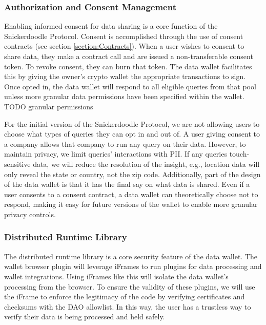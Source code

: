 \subsubsection{Authorization and Consent Management}

Enabling informed consent for data sharing is a core function of the Snickerdoodle Protocol. Consent is accomplished through the use of consent contracts 
(see section \ref{section:Contracts}). When a user wishes to consent to share data, they make a contract call and are issued a non-transferable consent 
token. To revoke consent, they can burn that token. The data wallet facilitates this by giving the owner's crypto wallet the appropriate transactions to 
sign. Once opted in, the data wallet will respond to all eligible queries from that pool unless more granular data permissions have been specified within 
the wallet. TODO granular permissions


For the initial version of the Snickerdoodle Protocol, we are not allowing users to choose what types of queries they can opt in and out of. A user giving 
consent to a company allows that company to run any query on their data. However, to maintain privacy, we limit queries' interactions with PII. If any 
queries touch-sensitive data, we will reduce the resolution of the insight, e.g., location data will only reveal the state or country, not the zip code. 
Additionally, part of the design of the data wallet is that it has the final say on what data is shared. Even if a user consents to a consent contract, a 
data wallet can theoretically choose not to respond, making it easy for future versions of the wallet to enable more granular privacy controls.

\subsubsection{Distributed Runtime Library}

The distributed runtime library is a core security feature of the data wallet. The wallet browser plugin will leverage iFrames to run plugins for data 
processing and wallet integrations. Using iFrames like this will isolate the data wallet's processing from the browser. To ensure the validity of these 
plugins, we will use the iFrame to enforce the legitimacy of the code by verifying certificates and checksums with the DAO allowlist. In this way, the 
user has a trustless way to verify their data is being processed and held safely.

